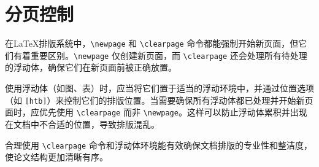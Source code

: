 \section{分页控制}

在\LaTeX{}排版系统中，\verb|\newpage| 和 \verb|\clearpage| 命令都能强制开始新页面，但它们有着重要区别。\verb|\newpage| 仅创建新页面，而 \verb|\clearpage| 还会处理所有待处理的浮动体，确保它们在新页面前被正确放置。

使用浮动体（如图、表）时，应当将它们置于适当的浮动环境中，并通过位置选项（如 \verb|[htb]|）来控制它们的排版位置。当需要确保所有浮动体都已处理并开始新页面时，应优先使用 \verb|\clearpage| 而非 \verb|\newpage|。这样可以防止浮动体累积并出现在文档中不合适的位置，导致排版混乱。

合理使用 \verb|\clearpage| 命令和浮动体环境能有效确保文档排版的专业性和整洁度，使论文结构更加清晰有序。
